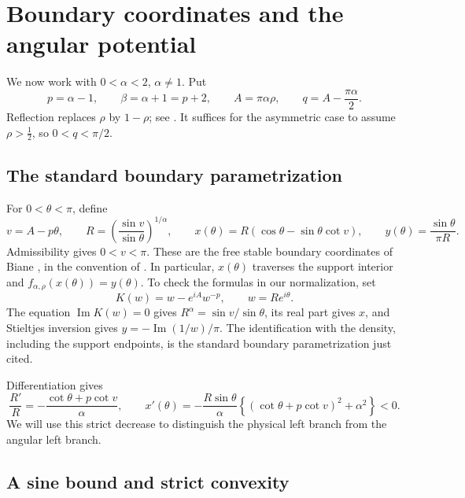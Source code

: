 \documentclass[11pt,a4paper]{article}
\theoremstyle{definition}
\theoremstyle{remark}
\numberwithin{equation}{section}
\begin{document}
\section{Boundary coordinates and the angular potential}
\label{sec:coordinates}

We now work with $0<\alpha<2$, $\alpha\ne1$. Put
\begin{equation}\label{eq:notation}
 p=\alpha-1,\qquad \beta=\alpha+1=p+2,\qquad
 A=\pi\alpha\rho,\qquad q=A-\frac{\pi\alpha}{2}.
\end{equation}
Reflection replaces $\rho$ by $1-\rho$; see \cite{HK,HSW}.
It suffices for the asymmetric case to assume $\rho>\tfrac12$,
so $0<q<\pi/2$.

\subsection{The standard boundary parametrization}

For $0<\theta<\pi$, define
\begin{equation}\label{eq:angular}
 v=A-p\theta,\qquad
 R=\left(\frac{\sin v}{\sin\theta}\right)^{1/\alpha},
 \qquad
 x(\theta)=R(\cos\theta-\sin\theta\cot v),
 \qquad
 y(\theta)=\frac{\sin\theta}{\pi R}.
\end{equation}
Admissibility gives $0<v<\pi$. These are the free stable boundary
coordinates of Biane \cite[Appendix A.1]{BP}, in the convention of
\cite{HK}. In particular, $x(\theta)$ traverses the support interior
and $f_{\alpha,\rho}(x(\theta))=y(\theta)$.
To check the formulas in our normalization, set
\[
 K(w)=w-e^{iA}w^{-p},\qquad w=R e^{i\theta}.
\]
The equation $\operatorname{Im}K(w)=0$ gives
$R^\alpha=\sin v/\sin\theta$, its real part gives $x$, and
Stieltjes inversion gives $y=-\operatorname{Im}(1/w)/\pi$.
The identification with the density, including the support endpoints,
is the standard boundary parametrization just cited.

Differentiation gives
\begin{equation}\label{eq:Rx-derivatives}
 \frac{R'}R=-\frac{\cot\theta+p\cot v}{\alpha},
 \qquad
 x'(\theta)=
 -\frac{R\sin\theta}{\alpha}
 \left\{(\cot\theta+p\cot v)^2+\alpha^2\right\}<0 .
\end{equation}
We will use this strict decrease to distinguish the physical left
branch from the angular left branch.

\subsection{A sine bound and strict convexity}
\end{document}
